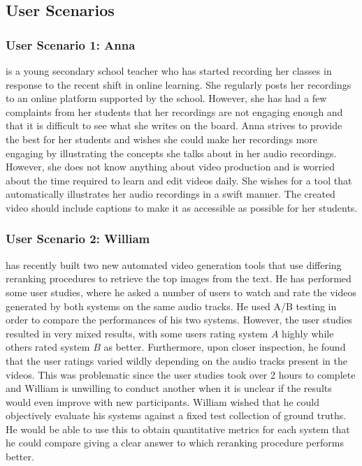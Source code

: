 \documentclass{l4proj}
\begin{document}
\subsection{User Scenarios}
\subsubsection{User Scenario 1: Anna} is a young secondary school teacher who has started recording her classes in response to the recent shift in online learning. She regularly posts her recordings to an online platform supported by the school. However, she has had a few complaints from her students that her recordings are not engaging enough and that it is difficult to see what she writes on the board. Anna strives to provide the best for her students and wishes she could make her recordings more engaging by illustrating the concepts she talks about in her audio recordings. However, she does not know anything about video production and is worried about the time required to learn and edit videos daily. She wishes for a tool that automatically illustrates her audio recordings in a swift manner. The created video should include captions to make it as accessible as possible for her students.

\subsubsection{User Scenario 2: William} has recently built two new automated video generation tools that use differing reranking procedures to retrieve the top images from the text. He has performed some user studies, where he asked a number of users to watch and rate the videos generated by both systems on the same audio tracks. He used A/B testing in order to compare the performances of his two systems. However, the user studies resulted in very mixed results, with some users rating system $A$ highly while others rated system $B$ as better. Furthermore, upon closer inspection, he found that the user ratings varied wildly depending on the audio tracks present in the videos. This was problematic since the user studies took over 2 hours to complete and William is unwilling to conduct another when it is unclear if the results would even improve with new participants. William wished that he could objectively evaluate his systems against a fixed test collection of ground truths. He would be able to use this to obtain quantitative metrics for each system that he could compare giving a clear answer to which reranking procedure performs better.
\end{document}
